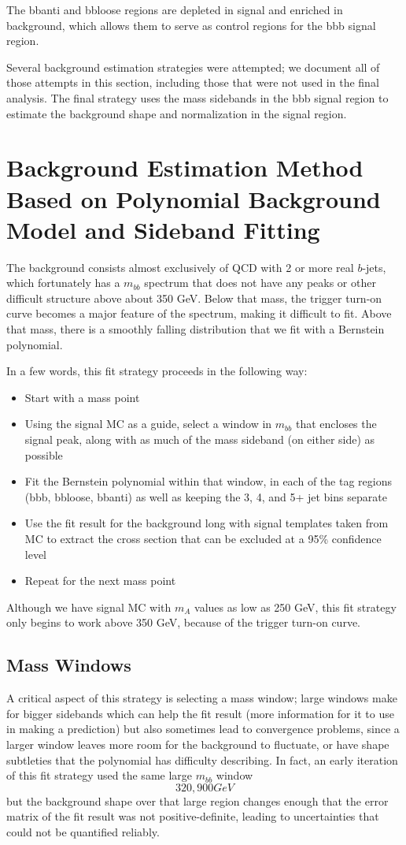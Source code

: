 The bbanti and bbloose regions are depleted in signal and enriched in background, which allows
them to serve as control regions for the bbb signal region.  

Several background estimation strategies were attempted; we document all of those attempts 
in this section, including those that were not used in the final analysis.  The final strategy
uses the mass sidebands in the bbb signal region to estimate the background shape and
normalization in the signal region.  


\section{Background Estimation Method Based on Polynomial Background Model and Sideband Fitting}
The background consists almost exclusively of QCD with 2 or more real $b$-jets, which 
fortunately has a $m_{bb}$ spectrum that does not have any peaks or other difficult
structure above about 350 GeV.  Below that mass, the trigger turn-on curve becomes
a major feature of the spectrum, making it difficult to fit.  Above that mass, there
is a smoothly falling distribution that we fit with a Bernstein polynomial.

In a few words, this fit strategy proceeds in the following way:
\begin{itemize}
    \item Start with a mass point
    \item Using the signal MC as a guide, select a window in $m_{bb}$ that encloses the
signal peak, along with as much of the mass sideband (on either side) as possible
    \item Fit the Bernstein polynomial within that window, in each of the 
tag regions (bbb, bbloose, bbanti) as well as keeping the 3, 4, and 5+ jet bins separate
    \item Use the fit result for the background long with signal templates taken from
 MC to extract the 
cross section that can be excluded at a 95\% confidence level
    \item Repeat for the next mass point
\end{itemize}

Although we have signal MC with $m_A$ values as low as 250 GeV, this fit strategy only
begins to work above 350 GeV, because of the trigger turn-on curve.  

\subsection{Mass Windows}
A critical aspect of this strategy is selecting a mass window; large windows make for bigger
sidebands which can help the fit result (more information for it to use in making a prediction)
but also sometimes lead to convergence problems, since a larger window leaves more room
for the background to fluctuate, or have shape subtleties that the polynomial has difficulty
describing.  In fact, an early iteration of this fit strategy used the same large $m_{bb}$ 
window \[320, 900 GeV\] but the background shape over that large region changes enough that
the error matrix of the fit result was not positive-definite, leading to uncertainties that 
could not be quantified reliably.   

